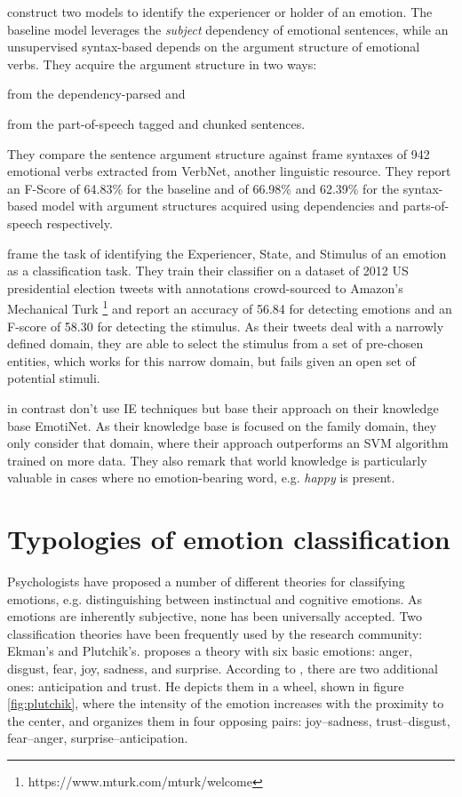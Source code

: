 \citeauthor{emotion_holder} construct two models to identify the experiencer or holder of an emotion. The baseline model leverages the \textit{subject} dependency of emotional sentences, while an unsupervised syntax-based depends on the argument structure of emotional verbs. They acquire the argument structure in two ways: 
\begin{inparaenum} \item from the dependency-parsed and \item from the part-of-speech tagged and chunked sentences. \end{inparaenum} They compare the sentence argument structure against frame syntaxes of 942 emotional verbs extracted from VerbNet, another linguistic resource. They report an F-Score of 64.83\% for the baseline and of 66.98\% and 62.39\% for the syntax-based model with argument structures acquired using dependencies and parts-of-speech respectively.

\citeauthor{semantic_role_labeling_tweets} frame the task of identifying the Experiencer, State, and Stimulus of an emotion as a classification task. They train their classifier on a dataset of 2012 US presidential election tweets with annotations crowd-sourced to Amazon's Mechanical Turk \footnote{https://www.mturk.com/mturk/welcome} and report an accuracy of 56.84 for detecting emotions and an F-score of 58.30 for detecting the stimulus. As their tweets deal with a narrowly defined domain, they are able to select the stimulus from a set of pre-chosen entities, which works for this narrow domain, but fails given an open set of potential stimuli.

\citeauthor{implicit_emotions} in contrast don't use IE techniques but base their approach on their knowledge base EmotiNet. As their knowledge base is focused on the family domain, they only consider that domain, where their approach outperforms an SVM algorithm trained on more data. They also remark that world knowledge is particularly valuable in cases where no emotion-bearing word, e.g. \textit{happy} is present.

\section{Typologies of emotion classification}

Psychologists have proposed a number of different theories for classifying emotions, e.g. distinguishing between instinctual and cognitive emotions. As emotions are inherently subjective, none has been universally accepted. Two classification theories have been frequently used by the research community: Ekman's and Plutchik's. \citeauthor{ekman_basic_emotions} proposes a theory with six basic emotions: anger, disgust, fear, joy, sadness, and surprise. According to \citeauthor{plutchik}, there are two additional ones: anticipation and trust. He depicts them in a wheel, shown in figure \ref{fig:plutchik}, where the intensity of the emotion increases with the proximity to the center, and organizes them in four opposing pairs: joy--sadness, trust--disgust, fear--anger, surprise--anticipation.

